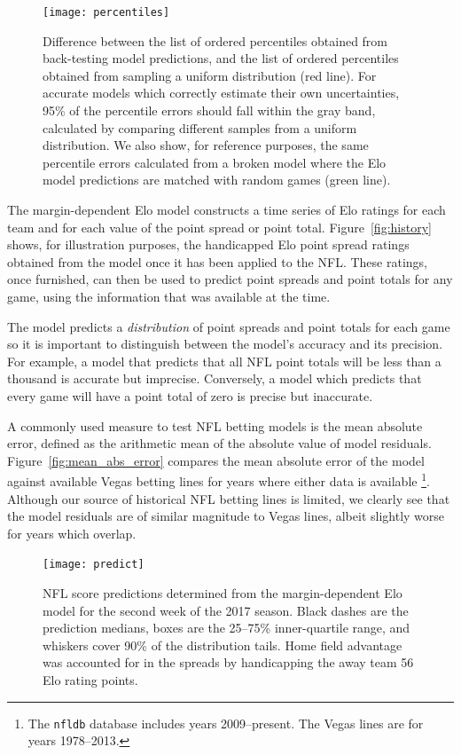 \documentclass[aps,prc,reprint,amsmath,superscriptaddress,nofootinbib]{revtex4-1}
\begin{document}
\begin{figure}
  \texttt{[image: percentiles]}
  \caption{\label{fig:percentiles} Difference between the list of ordered percentiles obtained from back-testing model predictions, and the list of ordered percentiles obtained from sampling a uniform distribution (red line).
For accurate models which correctly estimate their own uncertainties, 95\% of the percentile errors should fall within the gray band, calculated by comparing different samples from a uniform distribution.
  We also show, for reference purposes, the same percentile errors calculated from a broken model where the Elo model predictions are matched with random games (green line).
  }
\end{figure}

The margin-dependent Elo model constructs a time series of Elo ratings for each team and for each value of the point spread or point total.
Figure~\ref{fig:history} shows, for illustration purposes, the handicapped Elo point spread ratings obtained from the model once it has been applied to the NFL.
These ratings, once furnished, can then be used to predict point spreads and point totals for any game, using the information that was available at the time.

The model predicts a \emph{distribution} of point spreads and point totals for each game so it is important to distinguish between the model's accuracy and its precision. 
For example, a model that predicts that all NFL point totals will be less than a thousand is accurate but imprecise.
Conversely, a model which predicts that every game will have a point total of zero is precise but inaccurate.

A commonly used measure to test NFL betting models is the mean absolute error, defined as the arithmetic mean of the absolute value of model residuals.
Figure~\ref{fig:mean_abs_error} compares the mean absolute error of the model against available Vegas betting lines for years where either data is available \footnote{The \texttt{nfldb} database includes years 2009--present. The Vegas lines are for years 1978--2013.}.
Although our source of historical NFL betting lines is limited, we clearly see that the model residuals are of similar magnitude to Vegas lines, albeit slightly worse for years which overlap.

\begin{figure}
  \texttt{[image: predict]}
  \caption{\label{fig:predict} NFL score predictions determined from the margin-dependent Elo model for the second week of the 2017 season. Black dashes are the prediction medians, boxes are the 25--75\% inner-quartile range, and whiskers cover 90\% of the distribution tails. Home field advantage was accounted for in the spreads by handicapping the away team 56 Elo rating points.}
\end{figure}
\end{document}
